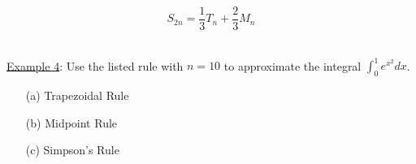 \documentclass[paper=a4, fontsize=11pt]{scrartcl} %
\numberwithin{equation}{section} %
\numberwithin{figure}{section} %
\numberwithin{table}{section} %
\newcommand{\ds}{\displaystyle}
\begin{document}
  \[S_{2n} = \frac{1}{3}T_n + \frac{2}{3}M_n\]
  
%  
%  
  
  
%  
  
  
%  
%  
%  
%  
\indent\\
 
  \underline{Example 4}: Use the listed rule with $n=10$ to approximate the integral $\ds\int_0^1 e^{x^2}dx$.
  \begin{enumerate}
  \item[(a)] Trapezoidal Rule
  
  \newpage
  
  \item[(b)] Midpoint Rule
  
  \vspace{4.5in}
  \item[(c)] Simpson's Rule
  \end{enumerate}
  \indent
  
  
  



















\end{document}
